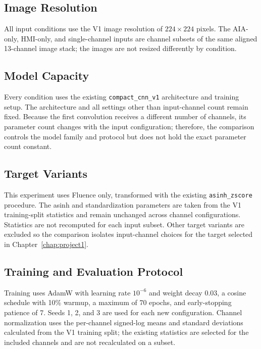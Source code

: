 \documentclass[12pt]{report}
\begin{document}
\subsection{Image Resolution}

All input conditions use the V1 image resolution of $224\times224$ pixels. The AIA-only, HMI-only, and single-channel inputs are channel subsets of the same aligned 13-channel image stack; the images are not resized differently by condition.

\subsection{Model Capacity}

Every condition uses the existing \texttt{compact\_cnn\_v1} architecture and training setup. The architecture and all settings other than input-channel count remain fixed. Because the first convolution receives a different number of channels, its parameter count changes with the input configuration; therefore, the comparison controls the model family and protocol but does not hold the exact parameter count constant.

\subsection{Target Variants}

This experiment uses Fluence only, transformed with the existing \texttt{asinh\_zscore} procedure. The asinh and standardization parameters are taken from the V1 training-split statistics and remain unchanged across channel configurations. Statistics are not recomputed for each input subset. Other target variants are excluded so the comparison isolates input-channel choices for the target selected in Chapter~\ref{chap:project1}.

\subsection{Training and Evaluation Protocol}

Training uses AdamW with learning rate $10^{-6}$ and weight decay $0.03$, a cosine schedule with 10\% warmup, a maximum of 70 epochs, and early-stopping patience of 7. Seeds 1, 2, and 3 are used for each new configuration. Channel normalization uses the per-channel signed-log means and standard deviations calculated from the V1 training split; the existing statistics are selected for the included channels and are not recalculated on a subset.
\end{document}
